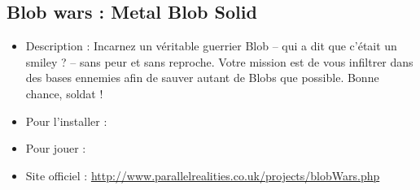 \subsection{Blob wars : Metal Blob Solid}
\begin{itemize}
\begingroup
{}
\item Description : Incarnez un véritable guerrier Blob -- qui a dit que c'était un smiley ? -- sans peur et sans reproche. Votre mission est de vous infiltrer dans des bases ennemies afin de sauver autant de Blobs que possible. Bonne chance, soldat !{\par}
\endgroup
\item Pour l'installer : 
\item Pour jouer : 
\item Site officiel : \url{http://www.parallelrealities.co.uk/projects/blobWars.php}{\par}
\end{itemize}
